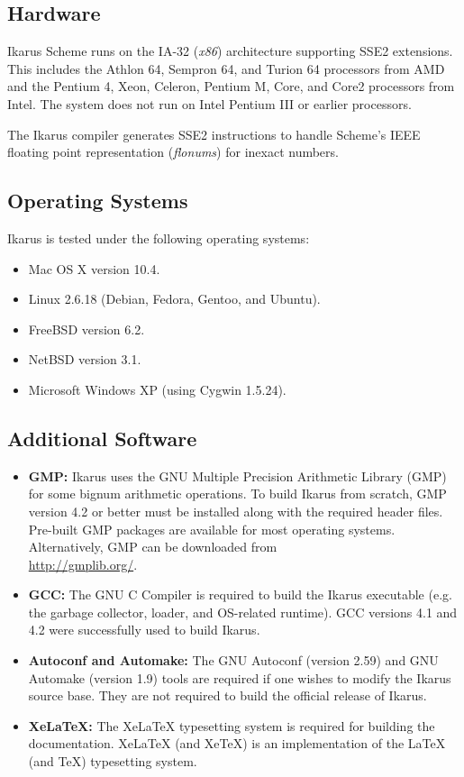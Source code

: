 \documentclass[onecolumn, 12pt, twoside, openright, dvipdfm]{book}
\begin{document}
\subsection{Hardware}

Ikarus Scheme runs on the IA-32 (\emph{x86}) architecture
supporting SSE2 extensions.  This includes the Athlon 64,
Sempron 64, and Turion 64 processors from AMD and the Pentium 4, Xeon,
Celeron, Pentium M, Core, and Core2 processors from Intel.  The
system does not run on Intel Pentium III or earlier
processors.

The Ikarus compiler generates SSE2 instructions to handle Scheme's
IEEE floating point representation (\emph{flonums}) for inexact
numbers. 

\subsection{Operating Systems}

Ikarus is tested under the following operating systems:

\begin{itemize}
\item Mac OS X version 10.4.
\item Linux 2.6.18 (Debian, Fedora, Gentoo, and Ubuntu).
\item FreeBSD version 6.2.
\item NetBSD version 3.1.
\item Microsoft Windows XP (using Cygwin 1.5.24).
\end{itemize}

\subsection{Additional Software}

\begin{itemize}
\item\textbf{GMP:} Ikarus uses the GNU Multiple Precision Arithmetic
Library (GMP) for some bignum arithmetic operations.  To build
Ikarus from scratch, GMP version 4.2 or better must be installed
along with the required header files.  Pre-built GMP packages  are
available for most operating systems.  Alternatively, GMP can be
downloaded from \\
\url{http://gmplib.org/}.

\item\textbf{GCC:} The GNU C Compiler is required to build the Ikarus
executable (e.g. the garbage collector, loader, and OS-related
runtime).  GCC versions 4.1 and 4.2 were successfully used to build
Ikarus.

\item\textbf{Autoconf and Automake:} The GNU Autoconf (version 2.59)
and GNU Automake (version 1.9) tools are required if one
wishes to modify the Ikarus source base.  They are not
required to build the official release of Ikarus.

\item\textbf{XeLaTeX:}  The XeLaTeX typesetting system is required
for building the documentation.  XeLaTeX (and XeTeX) is an
implementation of the LaTeX (and TeX) typesetting system.

\end{itemize}
\end{document}
